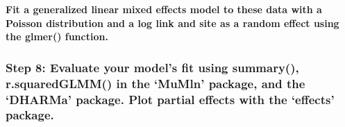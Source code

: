 \documentclass[]{article}
\begin{document}
\textbf{Fit a generalized linear mixed effects model to these data with
a Poisson distribution and a log link and site as a random effect using
the glmer() function.}

\hypertarget{step-8-evaluate-your-models-fit-using-summary-r.squaredglmm-in-the-mumln-package-and-the-dharma-package.-plot-partial-effects-with-the-effects-package.}{%
\subsubsection{\texorpdfstring{Step 8: \textbf{Evaluate your model's fit
using summary(), r.squaredGLMM() in the `MuMln' package, and the
`DHARMa' package. Plot partial effects with the `effects'
package.}}{Step 8: Evaluate your model's fit using summary(), r.squaredGLMM() in the `MuMln' package, and the `DHARMa' package. Plot partial effects with the `effects' package.}}\label{step-8-evaluate-your-models-fit-using-summary-r.squaredglmm-in-the-mumln-package-and-the-dharma-package.-plot-partial-effects-with-the-effects-package.}}
\end{document}
